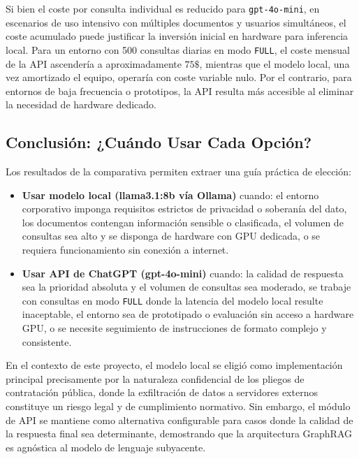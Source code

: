 Si bien el coste por consulta individual es reducido para \texttt{gpt-4o-mini}, en escenarios de uso intensivo con múltiples documentos y usuarios simultáneos, el coste acumulado puede justificar la inversión inicial en hardware para inferencia local. Para un entorno con 500 consultas diarias en modo \texttt{FULL}, el coste mensual de la API ascendería a aproximadamente $75\$ $, mientras que el modelo local, una vez amortizado el equipo, operaría con coste variable nulo. Por el contrario, para entornos de baja frecuencia o prototipos, la API resulta más accesible al eliminar la necesidad de hardware dedicado.

\subsection{Conclusión: ¿Cuándo Usar Cada Opción?}

Los resultados de la comparativa permiten extraer una guía práctica de elección:

\begin{itemize}
    \item \textbf{Usar modelo local (llama3.1:8b vía Ollama)} cuando: el entorno corporativo imponga requisitos estrictos de privacidad o soberanía del dato, los documentos contengan información sensible o clasificada, el volumen de consultas sea alto y se disponga de hardware con GPU dedicada, o se requiera funcionamiento sin conexión a internet.
    \item \textbf{Usar API de ChatGPT (gpt-4o-mini)} cuando: la calidad de respuesta sea la prioridad absoluta y el volumen de consultas sea moderado, se trabaje con consultas en modo \texttt{FULL} donde la latencia del modelo local resulte inaceptable, el entorno sea de prototipado o evaluación sin acceso a hardware GPU, o se necesite seguimiento de instrucciones de formato complejo y consistente.
\end{itemize}

En el contexto de este proyecto, el modelo local se eligió como implementación principal precisamente por la naturaleza confidencial de los pliegos de contratación pública, donde la exfiltración de datos a servidores externos constituye un riesgo legal y de cumplimiento normativo. Sin embargo, el módulo de API se mantiene como alternativa configurable para casos donde la calidad de la respuesta final sea determinante, demostrando que la arquitectura GraphRAG es agnóstica al modelo de lenguaje subyacente.
